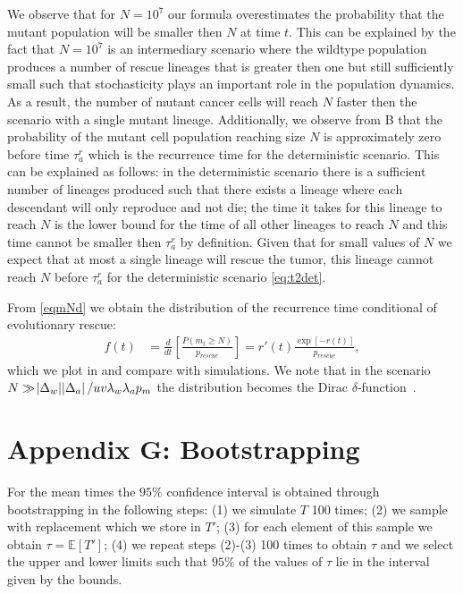 \documentclass[12pt]{extarticle}
\begin{document}
\begin{appendices}
We observe that for $N=10^7$ our formula overestimates the probability that the mutant population will be smaller then $N$ at time $t$.  This can be explained by the fact that $N=10^7$ is an intermediary scenario where the wildtype population produces a number of rescue lineages that is greater then one but still sufficiently small such that stochasticity plays an important role in the population dynamics. As a result, the number of mutant cancer cells will reach $N$ faster then the scenario with a single mutant lineage. Additionally, we observe from B that the probability of the mutant cell population reaching size $N$ is approximately zero before time $\tau_a^r$ which is the recurrence time for the deterministic scenario. This can be explained as follows: in the deterministic scenario there is a sufficient number of lineages produced such that there exists a lineage where each descendant will only reproduce and not die; the time it takes for this lineage to reach $N$ is the lower bound for the time of all other lineages to reach $N$ and this time cannot be smaller then $\tau_a^r$ by definition. Given that for small values of $N$ we expect that at most a single lineage will rescue the tumor, this lineage cannot reach $N$ before $\tau_a^r$ for the deterministic scenario \cref{eq:t2det}.

From  \cref{eqmNd} we obtain the distribution of the recurrence time conditional of evolutionary rescue:
\begin{align}\label{distribution}
f\left(t\right)&=\frac{d}{dt}\left[\frac{P\left(m_t\geq N\right)}{p_{rescue}}\right]=r'\left(t\right)\frac{\exp\left[-r\left(t\right)\right]}{p_{rescue}},
\end{align}
which we plot in  and compare with simulations. We note that in the scenario $N\gg\abs{\Delta_w}\abs{\Delta_a}/uv\lambda_w\lambda_ap_m$ the distribution becomes the Dirac $\delta$-function~\citep{barton1989elements}.
\section*{Appendix G: Bootstrapping}
For the mean times the $95\%$ confidence interval is obtained through bootstrapping in the following steps: (1) we simulate $T$ 100 times; (2) we sample with replacement which we store in $T'$; (3) for each element of this sample we obtain $\tau=\mathbb{E}\left[T'\right]$; (4) we repeat steps (2)-(3) 100 times to obtain $\tau$ and we select the upper and lower limits such that $95\%$ of the values of $\tau$ lie in the interval given by the bounds.


\end{appendices}
\end{document}
